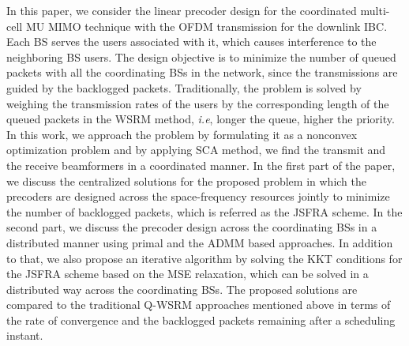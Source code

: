 In this paper, we consider the linear precoder design for the coordinated multi-cell \ac{MU} \ac{MIMO} technique with the \ac{OFDM} transmission for the downlink \ac{IBC}. Each \ac{BS} serves the users associated with it, which causes interference to the neighboring \ac{BS} users. The design objective is to minimize the number of queued packets with all the coordinating \acp{BS} in the network, since the transmissions are guided by the backlogged packets. Traditionally, the problem is solved by weighing the transmission rates of the users by the corresponding length of the queued packets in the \ac{WSRM} method, \textit{i.e}, longer the queue, higher the priority. In this work, we approach the problem by formulating it as a nonconvex optimization problem and by applying \ac{SCA} method, we find the transmit and the receive beamformers in a coordinated manner. In the first part of the paper, we discuss the centralized solutions for the proposed problem in which the precoders are designed across the space-frequency resources jointly to minimize the number of backlogged packets, which is referred as the \ac{JSFRA} scheme. In the second part, we discuss the precoder design across the coordinating \acp{BS} in a distributed manner using primal and the \ac{ADMM} based approaches. In addition to that, we also propose an iterative algorithm by solving the \ac{KKT} conditions for the \ac{JSFRA} scheme based on the \ac{MSE} relaxation, which can be  solved in a distributed way across the coordinating \acp{BS}. The proposed solutions are compared to the traditional \ac{Q-WSRM} approaches mentioned above in terms of the rate of convergence and the backlogged packets remaining after a scheduling instant.
